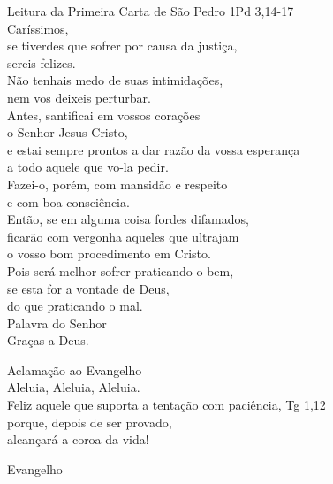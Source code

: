 \documentclass{book}
\begin{document}
\begin{flushleft}
    \vspace{.2cm}
    Leitura da Primeira Carta de São Pedro
    \hspace{\fill}
    \textcolor{VioletRed1}{1Pd 3,14-17}
    \vspace{.2cm}\\
    Caríssimos,\\
    se tiverdes que sofrer por causa da justiça,\\
    sereis felizes.\\
    Não tenhais medo de suas intimidações,\\
    nem vos deixeis perturbar.\\
    Antes, santificai em vossos corações\\
    o Senhor Jesus Cristo,\\
    e estai sempre prontos a dar razão da vossa esperança\\
    a todo aquele que vo-la pedir.\\
    Fazei-o, porém, com mansidão e respeito\\
    e com boa consciência.\\
    Então, se em alguma coisa fordes difamados,\\
    ficarão com vergonha aqueles que ultrajam\\
    o vosso bom procedimento em Cristo.\\
    Pois será melhor sofrer praticando o bem,\\
    se esta for a vontade de Deus,\\
    do que praticando o mal.
    \vspace{.1cm}\\
    Palavra do Senhor\\
    \RbarRed{} Graças a Deus.
\end{flushleft}
\textcolor{VioletRed1}{Aclamação ao Evangelho}
\vspace{.1cm}\\
\RbarRed{} Aleluia, Aleluia, Aleluia.\\
\VbarRed{} Feliz aquele que suporta a tentação com paciência,\hspace{\fill}
\textcolor{VioletRed1}{Tg 1,12}\\
porque, depois de ser provado,\\
alcançará a coroa da vida!
\hspace{\fill}\RbarRed{}
\begin{center}
    \textcolor{VioletRed1}{Evangelho}
\end{center}
\end{document}

